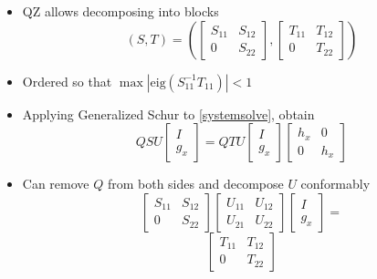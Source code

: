 \documentclass[bigger,handout]{beamer}
\begin{document}
\begin{frame}

\begin{itemize}
\item QZ allows decomposing into blocks
\begin{equation*}
\left(S,T\right)=\left(
  \begin{bmatrix}
  S_{11} & S_{12} \\
   0 & S_{22}
  \end{bmatrix}
  ,
    \begin{bmatrix}
  T_{11} & T_{12} \\
   0 & T_{22}
  \end{bmatrix}
  \right)
\end{equation*}
\item Ordered so that $\max\left|\text{eig} (S_{11}^{-1}T_{11})\right|<1$
\item Applying Generalized Schur to \ref{systemsolve}, obtain
\begin{equation*}
QSU \begin{bmatrix}
I \\
g_x
\end{bmatrix}
= QTU
  \begin{bmatrix}
I \\
g_x
\end{bmatrix}
  \begin{bmatrix}
  h_{x} & 0 \\
   0 &   h_{x}
  \end{bmatrix}
\end{equation*}
\item Can remove $Q$ from both sides and decompose $U$ conformably
\begin{equation*}
\begin{bmatrix}
  S_{11} & S_{12} \\
   0 & S_{22}
  \end{bmatrix}
  \begin{bmatrix}
  U_{11} & U_{12} \\
   U_{21} & U_{22}
  \end{bmatrix}
 \begin{bmatrix}
I \\
g_x
\end{bmatrix}
=
\end{equation*}
\begin{equation*}
    \begin{bmatrix}
  T_{11} & T_{12} \\
   0 & T_{22}

\end{bmatrix}
\end{equation*}
\end{itemize}
\end{frame}
\end{document}
